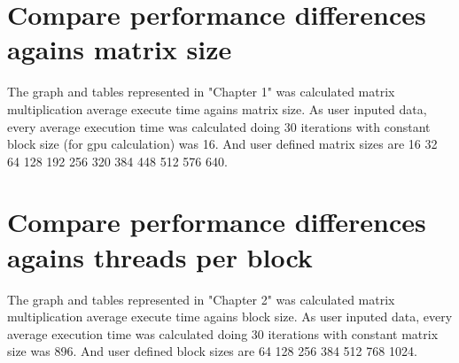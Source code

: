 \pagebreak
\section{Compare performance differences agains matrix size}
	The graph and tables represented in "Chapter 1" was calculated matrix multiplication average execute time agains matrix size. As user inputed data, every average execution time was calculated doing 30 iterations with constant block size (for gpu calculation) was 16. And user defined matrix sizes are 16 32 64 128 192 256 320 384 448 512 576 640.
\section{Compare performance differences agains threads per block}
	The graph and tables represented in "Chapter 2" was calculated matrix multiplication average execute time agains block size. As user inputed data, every average execution time was calculated doing 30 iterations with constant matrix size was 896. And user defined block sizes are 64 128 256 384 512 768 1024.
